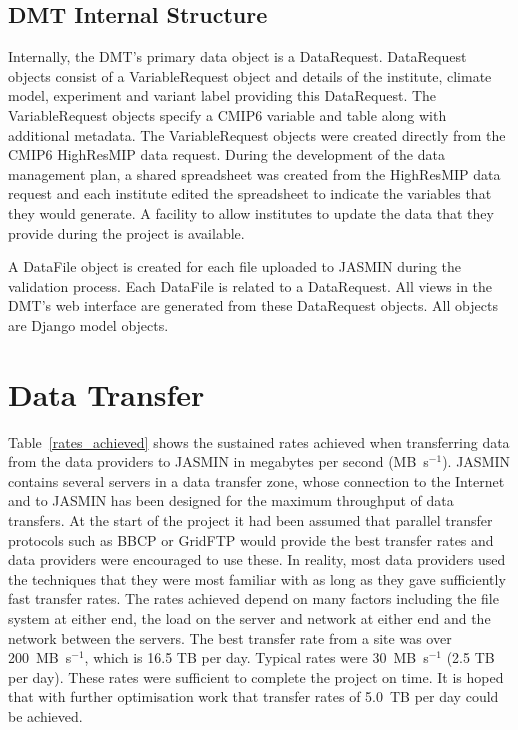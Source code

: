 \documentclass[gmd, manuscript]{copernicus}
\begin{document}
\subsection{DMT Internal Structure}
Internally, the DMT's primary data object is a DataRequest. DataRequest objects consist of a VariableRequest object and details of the institute, climate model, experiment and variant label providing this DataRequest. The VariableRequest objects specify a CMIP6 variable and table along with additional metadata. The VariableRequest objects were created directly from the CMIP6 HighResMIP data request. During the development of the data management plan, a shared spreadsheet was created from the HighResMIP data request and each institute edited the spreadsheet to indicate the variables that they would generate. A facility to allow institutes to update the data that they provide during the project is available.

A DataFile object is created for each file uploaded to JASMIN during the validation process. Each DataFile is related to a DataRequest. All views in the DMT's web interface are generated from these DataRequest objects. All objects are Django model objects.

\section{Data Transfer}
\label{transfer_rates}

Table~\ref{rates_achieved} shows the sustained rates achieved when transferring data from the data providers to JASMIN in megabytes per second (MB~s$^{-1}$). JASMIN contains several servers in a data transfer zone, whose connection to the Internet and to JASMIN has been designed for the maximum throughput of data transfers. At the start of the project it had been assumed that parallel transfer protocols such as BBCP or GridFTP would provide the best transfer rates and data providers were encouraged to use these. In reality, most data providers used the techniques that they were most familiar with as long as they gave sufficiently fast transfer rates. The rates achieved depend on many factors including the file system at either end, the load on the server and network at either end and the network between the servers. The best transfer rate from a site was over 200~MB~s$^{-1}$, which is 16.5 TB per day. Typical rates were 30~MB~s$^{-1}$ (2.5 TB per day). These rates were sufficient to complete the project on time. It is hoped that with further optimisation work that transfer rates of 5.0~TB per day could be achieved.
\end{document}

